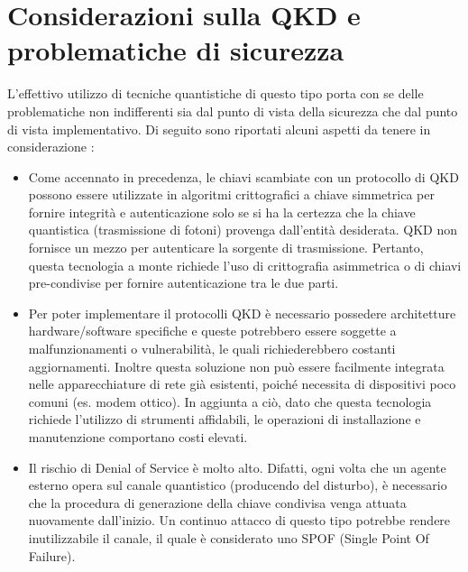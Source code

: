 \chapter{Considerazioni sulla QKD e problematiche di sicurezza}
L'effettivo utilizzo di tecniche quantistiche di questo tipo porta con se delle problematiche non indifferenti sia dal punto di vista della sicurezza che dal punto di vista implementativo. Di seguito sono riportati alcuni aspetti da tenere in considerazione \cite{chen_report_2016}:

\begin{itemize}
    \item Come accennato in precedenza, le chiavi scambiate con un protocollo di QKD possono essere utilizzate in algoritmi crittografici a chiave simmetrica per fornire integrità e autenticazione solo se si ha la certezza che la chiave quantistica (trasmissione di fotoni) provenga dall'entità desiderata. QKD non fornisce un mezzo per autenticare la sorgente di trasmissione. Pertanto, questa tecnologia a monte richiede l'uso di crittografia asimmetrica o di chiavi pre-condivise per fornire autenticazione tra le due parti.
    
    \item Per poter implementare il protocolli QKD è necessario possedere architetture hardware/software specifiche e queste potrebbero essere soggette a malfunzionamenti o vulnerabilità, le quali richiederebbero costanti aggiornamenti. Inoltre questa soluzione non può essere facilmente integrata nelle apparecchiature di rete già esistenti, poiché necessita di dispositivi poco comuni (es. modem ottico). In aggiunta a ciò, dato che questa tecnologia richiede l'utilizzo di strumenti affidabili, le operazioni di installazione e manutenzione comportano costi elevati.
    
    \item Il rischio di Denial of Service è molto alto. Difatti, ogni volta che un agente esterno opera sul canale quantistico (producendo del disturbo), è necessario che la procedura di generazione della chiave condivisa venga attuata nuovamente dall'inizio. Un continuo attacco di questo tipo potrebbe rendere inutilizzabile il canale, il quale è considerato uno SPOF (Single Point Of Failure).
\end{itemize}